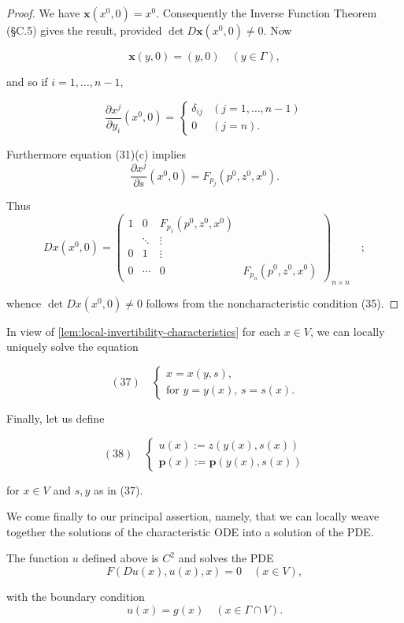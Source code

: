 \begin{proof}
We have $\mathbf{x}(x^0, 0) = x^0$. Consequently the Inverse Function Theorem (\S C.5) gives the result, provided $\det D\mathbf{x}(x^0, 0) \neq 0$. Now

$$\mathbf{x}(y, 0) = (y, 0) \quad (y \in \Gamma),$$

and so if $i = 1, \ldots, n-1$,

$$\frac{\partial x^j}{\partial y_i}(x^0, 0) = \begin{cases} \delta_{ij} & (j = 1, \ldots, n-1) \\ 0 & (j = n). \end{cases}$$

Furthermore equation (31)(c) implies
$$\frac{\partial x^j}{\partial s}(x^0, 0) = F_{p_j}(p^0, z^0, x^0).$$

Thus
$$Dx(x^0, 0) = \begin{pmatrix}
1 & 0 & F_{p_1}(p^0, z^0, x^0) \\
& \ddots & \vdots \\
0 & 1 & \vdots \\
0 & \cdots & 0 & F_{p_n}(p^0, z^0, x^0)
\end{pmatrix}_{n \times n} \quad ;$$

whence $\det Dx(x^0, 0) \neq 0$ follows from the noncharacteristic condition (35).
\end{proof}

In view of \cref{lem:local-invertibility-characteristics} for each $x \in V$, we can locally uniquely solve the equation

$$(37) \quad \begin{cases}
x = x(y, s), \\
\text{for } y = y(x), \, s = s(x).
\end{cases}$$

Finally, let us define

$$(38) \quad \begin{cases}
u(x) := z(y(x), s(x)) \\
\textbf{p}(x) := \textbf{p}(y(x), s(x))
\end{cases}$$

for $x \in V$ and $s, y$ as in (37).

We come finally to our principal assertion, namely, that we can locally weave together the solutions of the characteristic ODE into a solution of the PDE.

\begin{theorem}
\label{thm:local-existence-characteristics}
The function $u$ defined above is $C^2$ and solves the PDE
$$F(Du(x), u(x), x) = 0 \quad (x \in V),$$

with the boundary condition
$$u(x) = g(x) \quad (x \in \Gamma \cap V).$$
\end{theorem}

